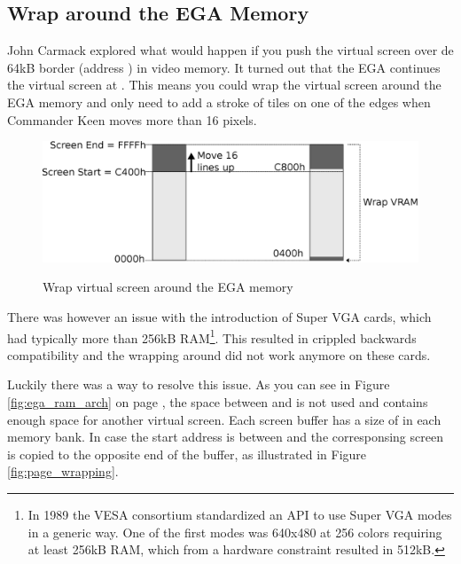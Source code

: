 \documentclass[book.tex]{subfiles}
\begin{document}
\subsection{Wrap around the EGA Memory}
\label{section:wrap_ega_memory}
\label{section:optimize_tile}
John Carmack explored what would happen if you push the virtual screen over de 64kB border (address ) in video memory. It turned out that the EGA continues the virtual screen at . This means you could wrap the virtual screen around  the EGA memory and only need to add a stroke of tiles on one of the edges when Commander Keen moves more than 16 pixels.\\
\par
\begin{figure}[H]
  \centering
  \includegraphics[width=\textwidth]{imgs/drawings/ega_wrapping.eps}
  \label{fig:ega_wrapping}
  \caption{Wrap virtual screen around the EGA memory}
\end{figure}
\par
There was however an issue with the introduction of Super VGA cards, which had typically more than 256kB RAM\footnote{In 1989 the VESA consortium standardized an API to use Super VGA modes in a generic way. One of the first modes was 640x480 at 256 colors requiring at least 256kB RAM, which from a hardware constraint resulted in 512kB.}. This resulted in crippled backwards compatibility and the wrapping around  did not work anymore on these cards. \\
\par
Luckily there was a way to resolve this issue. As you can see in Figure \ref{fig:ega_ram_arch} on page \pageref{fig:ega_ram_arch}, the space between  and  is not used and contains enough space for another virtual screen. Each screen buffer has a size of  in each memory bank. In case the start address is between  and  the corresponsing screen is copied to the opposite end of the buffer, as illustrated in Figure \ref{fig:page_wrapping}.\\
\par
\end{document}
